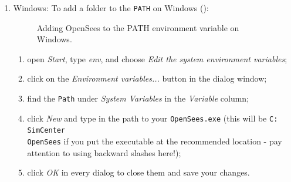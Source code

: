 \begin{enumerate}
\item Windows: To add a folder to the \texttt{PATH} on Windows ():

\begin{figure}[!htbp]
  \caption{Adding OpenSees to the PATH environment variable on Windows.}
  \label{fig:add_env_path}
\end{figure}


\begin{enumerate}
    \item open \emph{Start}, type \emph{env}, and choose \emph{Edit the system environment variables};
    \item click on the \emph{Environment variables...} button in the dialog window;
    \item find the \texttt{Path} under \emph{System Variables} in the \emph{Variable} column;
    \item click \emph{New} and type in the path to your \texttt{OpenSees.exe} (this will be \texttt{C:\\SimCenter\\OpenSees} if you put the executable at the recommended location - pay attention to using backward slashes here!);
    \item click \emph{OK} in every dialog to close them and save your changes.
\end{enumerate}


\end{enumerate}

